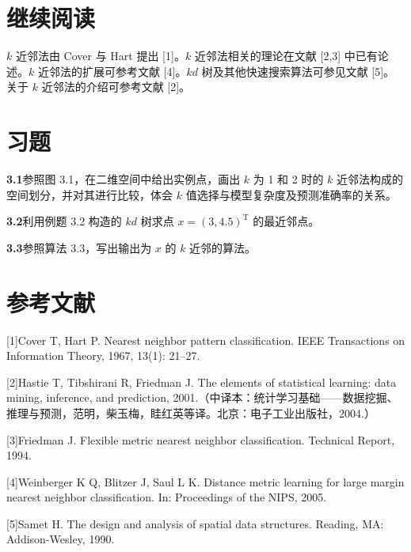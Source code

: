 \documentclass[UTF8,12pt,a4paper,fontset=fandol]{ctexart}
\begin{document}
\section*{继续阅读}

$k$ 近邻法由 Cover 与 Hart 提出 [1]。$k$ 近邻法相关的理论在文献 [2,3] 中已有论述。$k$ 近邻法的扩展可参考文献 [4]。$kd$ 树及其他快速搜索算法可参见文献 [5]。关于 $k$ 近邻法的介绍可参考文献 [2]。

\section*{习题}

\noindent\textbf{3.1}\quad 参照图 3.1，在二维空间中给出实例点，画出 $k$ 为 1 和 2 时的 $k$ 近邻法构成的空间划分，并对其进行比较，体会 $k$ 值选择与模型复杂度及预测准确率的关系。

\noindent\textbf{3.2}\quad 利用例题 3.2 构造的 $kd$ 树求点 $x=(3,4.5)^{\mathrm T}$ 的最近邻点。

\noindent\textbf{3.3}\quad 参照算法 3.3，写出输出为 $x$ 的 $k$ 近邻的算法。

\section*{参考文献}

[1]\quad Cover T, Hart P. Nearest neighbor pattern classification. IEEE Transactions on Information Theory, 1967, 13(1): 21--27.

[2]\quad Hastie T, Tibshirani R, Friedman J. The elements of statistical learning: data mining, inference, and prediction, 2001.（中译本：统计学习基础——数据挖掘、推理与预测，范明，柴玉梅，眭红英等译。北京：电子工业出版社，2004.）

[3]\quad Friedman J. Flexible metric nearest neighbor classification. Technical Report, 1994.

[4]\quad Weinberger K Q, Blitzer J, Saul L K. Distance metric learning for large margin nearest neighbor classification. In: Proceedings of the NIPS, 2005.

[5]\quad Samet H. The design and analysis of spatial data structures. Reading, MA: Addison-Wesley, 1990.
\end{document}
